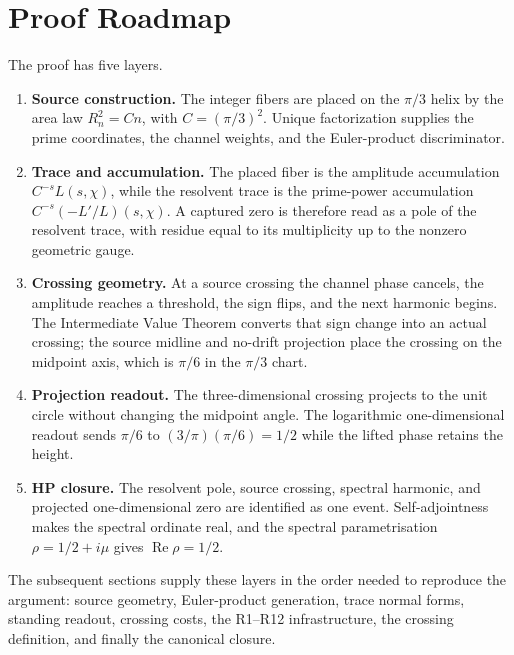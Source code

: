 \documentclass[11pt]{article}
\DeclareMathOperator{\Ree}{Re}
\begin{document}
\section{Proof Roadmap}

The proof has five layers.

\begin{enumerate}[label=(P\arabic*)]
\item \textbf{Source construction.}
The integer fibers are placed on the $\pi/3$ helix by the area law
$R_n^2=Cn$, with $C=(\pi/3)^2$.  Unique factorization supplies the prime
coordinates, the channel weights, and the Euler-product discriminator.

\item \textbf{Trace and accumulation.}
The placed fiber is the amplitude accumulation $C^{-s}L(s,\chi)$, while the
resolvent trace is the prime-power accumulation
$C^{-s}(-L'/L)(s,\chi)$.  A captured zero is therefore read as a pole of the
resolvent trace, with residue equal to its multiplicity up to the nonzero
geometric gauge.

\item \textbf{Crossing geometry.}
At a source crossing the channel phase cancels, the amplitude reaches a
threshold, the sign flips, and the next harmonic begins.  The Intermediate
Value Theorem converts that sign change into an actual crossing; the source
midline and no-drift projection place the crossing on the midpoint axis, which
is $\pi/6$ in the $\pi/3$ chart.

\item \textbf{Projection readout.}
The three-dimensional crossing projects to the unit circle without changing the
midpoint angle.  The logarithmic one-dimensional readout sends
$\pi/6$ to $(3/\pi)(\pi/6)=1/2$ while the lifted phase retains the height.

\item \textbf{HP closure.}
The resolvent pole, source crossing, spectral harmonic, and projected
one-dimensional zero are identified as one event.  Self-adjointness makes the
spectral ordinate real, and the spectral parametrisation
$\rho=1/2+i\mu$ gives $\Ree\rho=1/2$.
\end{enumerate}

The subsequent sections supply these layers in the order needed to reproduce
the argument: source geometry, Euler-product generation, trace normal forms,
standing readout, crossing costs, the R1--R12 infrastructure, the crossing
definition, and finally the canonical closure.
\end{document}
